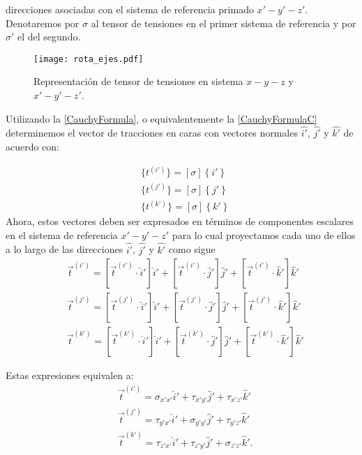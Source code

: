 \documentclass[../notas medios.tex]{subfiles}
\begin{document}
direcciones asociadas con el sistema de referencia primado $x'-y'-z'$. 
Denotaremos por $\sigma$ al tensor de tensiones en el primer sistema de 
referencia y por $\sigma'$ el del segundo. 

\begin{figure}[H]
\centering
\texttt{[image: rota\_ejes.pdf]}
\caption{Representación de tensor de tensiones en sistema $x-y-z$ y $x'-y'-z'$.}
\label{roteje}
\end{figure}


Utilizando la \cref{CauchyFormula}, o equivalentemente la \cref{CauchyFormulaC} determinemos el vector de tracciones en caras
con vectores normales $\hat{i'}$, $\hat{j'}$ y $\hat{k'}$ de acuerdo con:
%

\begin{equation}
\begin{aligned}
&\{ t^{(i')} \} = \left[ \sigma  \right]\left\{ i' \right\} \\
&\{ t^{(j')} \} = \left[ \sigma  \right]\left\{ j' \right\} \\
&\{ t^{(k')} \} = \left[ \sigma  \right]\left\{ k' \right\}
\end{aligned}
\label{proy1}
\end{equation}
%
Ahora, estos vectores deben ser expresados en términos de componentes escalares 
en el sistema de referencia $x'-y'-z'$ para lo cual proyectamos cada uno de 
ellos a lo largo de las direcciones $\hat{i'}$, $\hat{j'}$ y $\hat{k'}$ como 
sigue
\begin{equation}
\begin{aligned}
&\vec{t}^{(i')} = [\vec{t}^{(i')} \cdot \hat i']\hat i' + [\vec{t}^{(i')} 
\cdot \hat j']\hat j' + [\vec{t}^{(i')} \cdot \hat k']\hat k' \\
&\vec{t}^{(j')} = [\vec{t}^{(j')} \cdot \hat i']\hat i' + [\vec{t}^{(j')} \cdot 
\hat j']\hat j' + [\vec{t}^{(j')} \cdot \hat k']\hat k' \\
&\vec{t}^{(k')} = [\vec{t}^{(k')} \cdot \hat i']\hat i' + [\vec{t}^{(k')} \cdot 
\hat j']\hat j' + [\vec{t}^{(k')} \cdot \hat k']\hat k'
\end{aligned}
\label{proy2}
\end{equation}

Estas expresiones equivalen a:
\begin{align*}
& \vec{t}^{(i')} = \sigma_{x'x'}\hat i' + \tau_{x'y'}\hat j' + \tau_{x'z'}\hat 
k' \\
& \vec{t}^{(j')} = \tau_{y'x'}\hat i' + \sigma_{y'y'}\hat j' + \tau_{y'z'}\hat 
k' \\
&\vec{t}^{(k')} = \tau_{z'x'}\hat i' + \tau_{z'y'}\hat j' + \sigma_{z'z'}\hat 
k'.
\end{align*} \\
\end{document}
